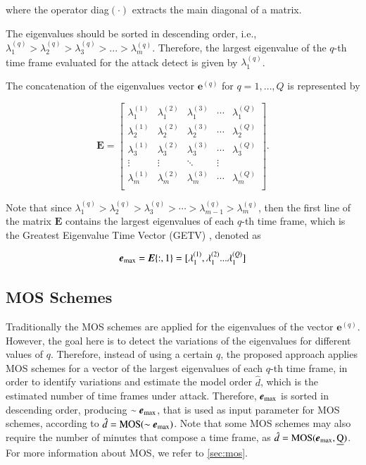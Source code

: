 \documentclass[review]{elsarticle}
\begin{document}
where the operator diag$(\cdot)$ extracts the main diagonal of a matrix.

The eigenvalues should be sorted in descending order, i.e., $\lambda_{1}^{(q)} > \lambda_{2}^{(q)} > \lambda_{3}^{(q)} > ... > \lambda_{m}^{(q)}$. Therefore, the largest eigenvalue of the $q$-th time frame evaluated for the attack detect is given by $\lambda_{1}^{(q)}$.

The concatenation of the eigenvalues vector $\boldsymbol{e}^{(q)}$ for $q = 1, \ldots, Q$ is represented by

\begin{equation}\label{eq:eq07}
\boldsymbol{E} =
\begin{bmatrix}
  \lambda_1^{(1)} & \lambda_1^{(2)} & \lambda_1^{(3)} & \cdots & \lambda_1^{(Q)} \\
  \lambda_2^{(1)} & \lambda_2^{(2)} & \lambda_2^{(3)} & \cdots & \lambda_2^{(Q)} \\
  \lambda_3^{(1)} & \lambda_3^{(2)} & \lambda_3^{(3)} & \cdots & \lambda_3^{(Q)} \\
  \vdots & \vdots & \ddots & \vdots  \\
  \lambda_m^{(1)} & \lambda_m^{(2)} & \lambda_m^{(3)} & \cdots & \lambda_m^{(Q)} \\
\end{bmatrix}.
\end{equation}

Note that since $\lambda_1^{(q)} > \lambda_2^{(q)} > \lambda_3^{(q)} > \cdots > \lambda_{m-1}^{(q)} > \lambda_m^{(q)}$, then the first line of the matrix $\boldsymbol{E}$ contains the largest eigenvalues of each $q$-th time frame, which is the Greatest Eigenvalue Time
Vector (GETV) \cite{tenorio2013greatest}, denoted as 

\begin{equation}\label{eq:eq08}
\boldsymbol{e}_{\rm max} = \boldsymbol{E}\{:,1\} = [ \lambda_1^{(1)}, \lambda_1^{(2)} ... \lambda_1^{(Q)}]
\end{equation}

\subsection{MOS Schemes}
\label{sec:prop_MOSSchemes}

Traditionally the MOS schemes are applied for the eigenvalues of the vector $\boldsymbol{e}^{(q)}$. However, the goal here is to detect the variations of the eigenvalues for different values of $q$. Therefore, instead of using a certain $q$, the proposed approach applies MOS schemes for a vector of the largest eigenvalues of each $q$-th time frame, in order to identify variations and estimate the model order $\hat{d}$, which is the estimated number of time frames under attack. Therefore, $\boldsymbol{e}_{\rm max}$ is sorted in descending order, producing $\sim\boldsymbol{e}_{\rm max}$, that is used as input parameter for MOS schemes, according to $\hat{d} = \rm{MOS}(\sim\boldsymbol{e}_{\rm max})$. Note that some MOS schemes may also require the number of minutes that compose a time frame, as $\hat{d} = \rm{MOS}(\boldsymbol{e}_{\rm max},\emph{Q})$. For more information about MOS, we refer to \ref{sec:mos}.
\end{document}
